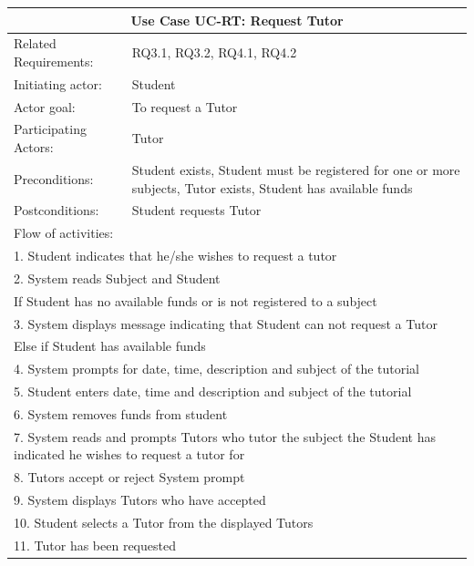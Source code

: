 \documentclass[12pt]{article}
\begin{document}
{\begin{tabular}{| l | p{10cm}| }
			\hline\multicolumn{2}{|c|}{ \textbf{Use Case UC-RT: Request Tutor}} \\ \hline
			Related Requirements: & RQ3.1, RQ3.2, RQ4.1, RQ4.2\\ \hline
			Initiating actor: & Student\\ \hline
			Actor goal: & To request a Tutor\\ \hline
			Participating Actors: & Tutor\\ \hline
			Preconditions: & Student exists, Student must be registered for one or more subjects, Tutor exists, Student has available funds\\ \hline
			Postconditions: & Student requests Tutor\\ \hline
			\multicolumn{2}{|l|}{Flow of activities:}\\ \hline
			\multicolumn{2}{|p{15cm}|}{1. Student indicates that he/she wishes to request a tutor}\\
			\multicolumn{2}{|p{15cm}|}{2. System reads Subject and Student}\\
			\multicolumn{2}{|p{15cm}|}{If Student has no available funds or is not registered to a subject}\\
			\multicolumn{2}{|p{15cm}|}{3. System displays message indicating that Student can not request a Tutor}\\
			\multicolumn{2}{|p{15cm}|}{Else if Student has available funds }	\\
			\multicolumn{2}{|l|}{4. System prompts for date, time, description and subject of the tutorial}\\
			\multicolumn{2}{|l|}{5. Student enters date, time and description and subject of the tutorial}\\
      \multicolumn{2}{|l|}{6. System removes funds from student}\\
			\multicolumn{2}{|p{15cm}|}{7. System reads and prompts Tutors who tutor the subject the Student has indicated he wishes to request a tutor for}\\
			\multicolumn{2}{|l|}{8. Tutors accept or reject System prompt}\\
			\multicolumn{2}{|l|}{9. System displays Tutors who have accepted}\\
			\multicolumn{2}{|l|}{10. Student selects a Tutor from the displayed Tutors}\\
			\multicolumn{2}{|l|}{11. Tutor has been requested}
			\\ \hline
		\end{tabular}

}
\end{document}
